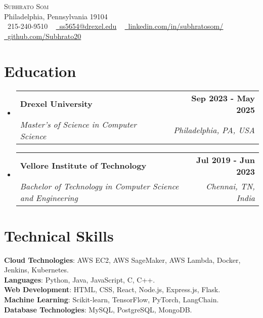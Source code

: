 \documentclass[letterpaper,11pt]{article}
\makeatletter
\newcommand{\resumeSubheading}[4]{
  \vspace{-2pt}\item
    \begin{tabular*}{1.0\textwidth}[t]{l@{\extracolsep{\fill}}r}
      \textbf{#1} & \textbf{\small #2} \\
      \textit{\small#3} & \textit{\small #4} \\
    \end{tabular*}\vspace{-7pt}
}
\newcommand{\resumeSubHeadingListStart}{\begin{itemize}[leftmargin=0.0in, label={}]}
\newcommand{\resumeSubHeadingListEnd}{\end{itemize}}
\makeatother
\begin{document}

\vspace{-16pt}
\begin{center}
    {\Huge \scshape Subhrato Som} \\ \vspace{1pt}
    Philadelphia, Pennsylvania 19104 \\ \vspace{1pt}
    \small \raisebox{-0.1\height}\faPhone\ 215-240-9510 ~ \href{mailto:ss5654@drexel.edu}{\raisebox{-0.2\height}\faEnvelope\  \underline{ss5654@drexel.edu}} ~ 
    \href{https://linkedin.com/in/subhratosom/}{\raisebox{-0.2\height}\faLinkedin\ \underline{linkedin.com/in/subhratosom/}}  ~
    \href{https://github.com/Subhrato20}{\raisebox{-0.2\height}\faGithub\ \underline{github.com/Subhrato20}}
    \vspace{-8pt}
\end{center}

\section{Education}
  \resumeSubHeadingListStart
  
    \resumeSubheading
      {Drexel University}{Sep 2023 - May 2025}
      {Master's of Science in Computer Science}{Philadelphia, PA, USA}

    \vspace{-5pt}
    \resumeSubheading
      {Vellore Institute of Technology}{Jul 2019 - Jun 2023}
      {Bachelor of Technology in Computer Science and Engineering}{Chennai, TN, India}

  
  \resumeSubHeadingListEnd
\vspace{-15pt}

\section{Technical Skills}

\begin{itemize}[leftmargin=0.15in, label={}]
	\small{\item{
		\textbf{Cloud Technologies}{: AWS EC2, AWS SageMaker, AWS Lambda, Docker, Jenkins, Kubernetes.} \\
		\textbf{Languages}{: Python, Java, JavaScript, C, C++.} \\
		\textbf{Web Development}{: HTML, CSS, React, Node.js, Express.js, Flask.} \\
		\textbf{Machine Learning}{: Scikit-learn, TensorFlow, PyTorch, LangChain.} \\
		\textbf{Database Technologies}{: MySQL, PostgreSQL, MongoDB.}
	}}
\end{itemize}
\vspace{-18pt}
\end{document}
